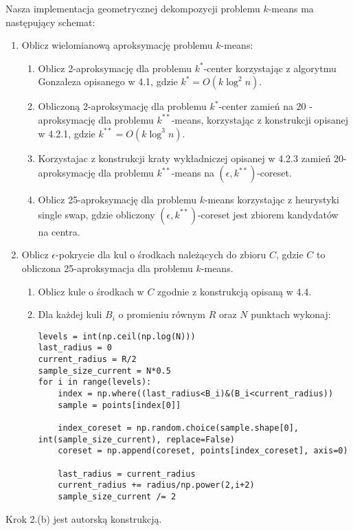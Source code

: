 \noindent
Nasza implementacja geometrycznej dekompozycji problemu $k$-means ma następujący schemat:
\begin{enumerate}
    \item Oblicz wielomianową aproksymację problemu $k$-means:
    \begin{enumerate}
        \item Oblicz 2-aproksymację dla problemu $k^{*}$-center korzystając z algorytmu Gonzaleza opisanego w 4.1, gdzie $k^{*} = O(k \log^2 n)$.
        \item Obliczoną 2-aproksymację dla problemu $k^{*}$-center zamień na 20 - aproksymację dla problemu $k^{**}$-means, korzystając z konstrukcji opisanej w 4.2.1, gdzie $k^{**} = O(k \log^3 n)$.
        \item Korzystajac z konstrukcji kraty wykładniczej opisanej w 4.2.3 zamień 20-aproksymację dla problemu $k^{**}$-means na $(\epsilon, k^{**})$-coreset.
        \item Oblicz 25-aproksymację dla problemu $k$-means korzystając z heurystyki single swap, gdzie obliczony $(\epsilon, k^{**})$-coreset jest zbiorem kandydatów na centra.
    \end{enumerate}
    \item Oblicz $\epsilon$-pokrycie dla kul o środkach należących do zbioru $C$, gdzie $C$ to obliczona 25-aproksymacja dla problemu $k$-means.
    \begin{enumerate}
        \item Oblicz kule o środkach w $C$ zgodnie z konstrukcją opisaną w 4.4.
        \item Dla każdej kuli $B_{i}$ o promieniu równym $R$ oraz $N$ punktach wykonaj:
            \lstset{language=python}
            \begin{lstlisting}
levels = int(np.ceil(np.log(N)))
last_radius = 0
current_radius = R/2
sample_size_current = N*0.5
for i in range(levels):
    index = np.where((last_radius<B_i)&(B_i<current_radius))
    sample = points[index[0]]

    index_coreset = np.random.choice(sample.shape[0], int(sample_size_current), replace=False)
    coreset = np.append(coreset, points[index_coreset], axis=0)

    last_radius = current_radius
    current_radius += radius/np.power(2,i+2)
    sample_size_current /= 2
            \end{lstlisting}
    \end{enumerate}
\end{enumerate}
\noindent
Krok 2.(b) jest autorską konstrukcją.
